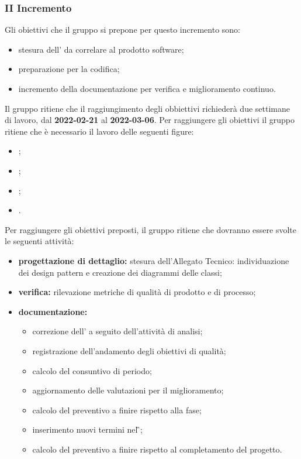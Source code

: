 \subsubsection{II Incremento}
Gli obiettivi che il gruppo si prepone per questo incremento sono:
\begin{itemize}
	\item stesura dell'\AT{} da correlare al prodotto software;
	\item preparazione per la codifica;
 \item incremento della documentazione per verifica e miglioramento continuo.
\end{itemize}
Il gruppo ritiene che il raggiungimento degli obbiettivi richiederà due settimane di lavoro, dal \textbf{2022-02-21} al \textbf{2022-03-06}.
Per raggiungere gli obiettivi il gruppo ritiene che è necessario il lavoro delle seguenti figure:
\begin{itemize}
	\item \RE{};
 	\item \AM{};
   	\item \PT{};
   	\item \VE{}.
\end{itemize}
Per raggiungere gli obiettivi preposti, il gruppo ritiene che dovranno essere svolte le seguenti attività:
\begin{itemize}
	\item \textbf{progettazione di dettaglio:} stesura dell’Allegato Tecnico: individuazione dei design pattern e creazione dei diagrammi delle classi;
 	\item \textbf{verifica:} rilevazione metriche di qualità di prodotto e di processo;
	\item \textbf{documentazione:} 
	 \begin{itemize}
		 \item correzione dell’\AdR{} a seguito dell’attività di analisi;
		   \item registrazione dell’andamento degli obiettivi di qualità;
		   \item calcolo del consuntivo di periodo;
		  \item aggiornamento delle valutazioni per il miglioramento; 
		  \item calcolo del preventivo a finire rispetto alla fase;
    	 \item inserimento nuovi termini nel \G{};
			\item calcolo del preventivo a finire rispetto al completamento del progetto.
	 \end{itemize}
\end{itemize}
